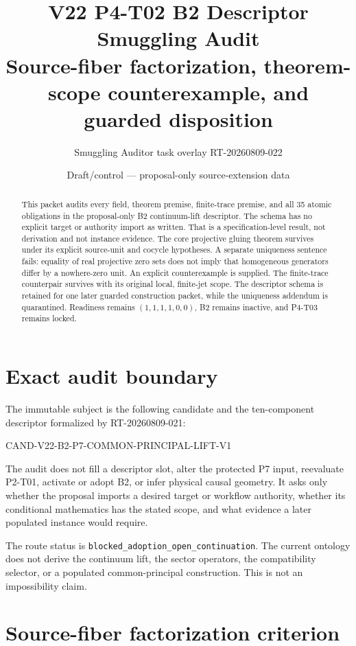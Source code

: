 \documentclass[11pt]{article}
\title{V22 P4-T02 B2 Descriptor Smuggling Audit\\
\large Source-fiber factorization, theorem-scope counterexample, and guarded disposition}
\author{Smuggling Auditor task overlay RT-20260809-022}
\date{Draft/control --- proposal-only source-extension data}
\begin{document}
\maketitle

\begin{abstract}
This packet audits every field, theorem premise, finite-trace premise, and all
35 atomic obligations in the proposal-only B2 continuum-lift descriptor.  The
schema has no explicit target or authority import as written.  That is a
specification-level result, not derivation and not instance evidence.  The
core projective gluing theorem survives under its explicit source-unit and
cocycle hypotheses.  A separate uniqueness sentence fails: equality of real
projective zero sets does not imply that homogeneous generators differ by a
nowhere-zero unit.  An explicit counterexample is supplied.  The finite-trace
counterpair survives with its original local, finite-jet scope.  The descriptor
schema is retained for one later guarded construction packet, while the
uniqueness addendum is quarantined.  Readiness remains
$(1,1,1,1,0,0)$, B2 remains inactive, and P4-T03 remains locked.
\end{abstract}

\section{Exact audit boundary}

The immutable subject is the following candidate and the ten-component
descriptor formalized by RT-20260809-021:
\begin{center}\small\ttfamily
CAND-V22-B2-P7-COMMON-PRINCIPAL-LIFT-V1
\end{center}
The audit does not fill a descriptor
slot, alter the protected P7 input, reevaluate P2-T01, activate or adopt B2, or
infer physical causal geometry.  It asks only whether the proposal imports a
desired target or workflow authority, whether its conditional mathematics has
the stated scope, and what evidence a later populated instance would require.

The route status is \texttt{blocked\_adoption\_open\_continuation}.  The
current ontology does not derive the continuum lift, the sector operators, the
compatibility selector, or a populated common-principal construction.  This is
not an impossibility claim.

\section{Source-fiber factorization criterion}
\end{document}
